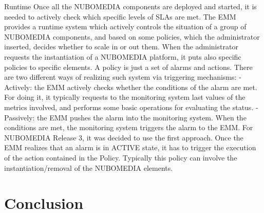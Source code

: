 Runtime
Once all the NUBOMEDIA components are deployed and started, it is needed to
actively check which specific levels of SLAs are met. The EMM provides a runtime
system which actively controls the situation of a group of NUBOMEDIA components,
and based on some policies, which the administrator inserted, decides whether to scale
in or out them.
When the administrator requests the instantiation of a NUBOMEDIA platform, it puts
also specific policies to specific elements. A policy is just a set of alarms and actions.
There are two different ways of realizing such system via triggering mechanisms:
- Actively: the EMM actively checks whether the conditions of the alarm are met.
For doing it, it typically requests to the monitoring system last values of the
metrics involved, and performs some basic operations for evaluating the status.
- Passively: the EMM pushes the alarm into the monitoring system. When the
conditions are met, the monitoring system triggers the alarm to the EMM.
For NUBOMEDIA Release 3, it was decided to use the first approach. Once the EMM
realizes that an alarm is in ACTIVE state, it has to trigger the execution of the action
contained in the Policy. Typically this policy can involve the instantiation/removal of
the NUBOMEDIA elements.
\section{Conclusion}